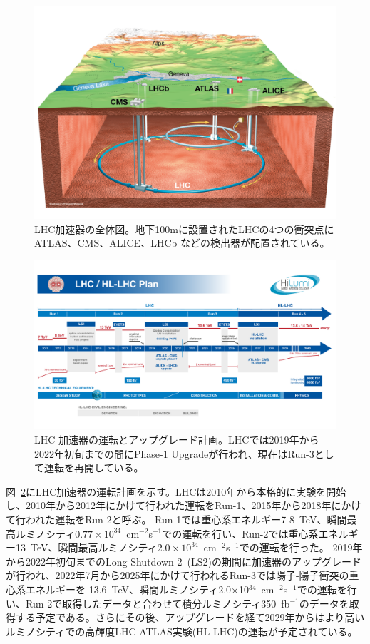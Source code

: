 \begin{figure}[tb]
  \centering
  \includegraphics[clip, width=14cm]{fig/2/LHC_overview.pdf}
  \caption{LHC加速器の全体図\cite{article:Overall_view_LHC}。地下100mに設置されたLHCの4つの衝突点に ATLAS、CMS、ALICE、LHCb などの検出器が配置されている。}
  \label{fig:LHC_overview}
\end{figure}

\begin{figure}[tb]
  \centering
  \includegraphics[clip, width=15cm]{fig/1/HL-LHC_Janvier2022.pdf}
  \caption{LHC 加速器の運転とアップグレード計画\cite{article:LHCDesignReport}。LHCでは2019年から2022年初旬までの間にPhase-1 Upgradeが行われ、現在はRun-3として運転を再開している。}
  \label{fig:LHC_Plan}
\end{figure}

図~\ref{fig:LHC_Plan}にLHC加速器の運転計画を示す\cite{article:LHCDesignReport}。LHCは2010年から本格的に実験を開始し、2010年から2012年にかけて行われた運転を\mbox{Run-1}、2015年から2018年にかけて行われた運転をRun-2と呼ぶ。
 \mbox{Run-1}では重心系エネルギー7-8~TeV、瞬間最高ルミノシティ$0.77\times10^{34}$~cm$^{-2}$s$^{-1}$での運転を行い、Run-2では重心系エネルギー13~TeV、瞬間最高ルミノシティ$2.0\times10^{34}$~cm$^{-2}$s$^{-1}$での運転を行った。
2019年から2022年初旬までのLong Shutdown 2~(LS2)の期間に加速器のアップグレードが行われ、2022年7月から2025年にかけて行われるRun-3では陽子-陽子衝突の重心系エネルギーを 13.6~TeV、瞬間ルミノシティ2.0$\times$10$^{34}$~cm$^{-2}$s$^{-1}$での運転を行い、Run-2で取得したデータと合わせて積分ルミノシティ350~fb$^{-1}$のデータを取得する予定である。さらにその後、アップグレードを経て2029年からはより高いルミノシティでの高輝度LHC-ATLAS実験(HL-LHC)の運転が予定されている。


